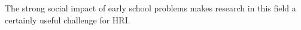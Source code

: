 \documentclass{sig-alternate}
\begin{document}
The strong social impact of early school problems makes research in this field
a certainly useful challenge for HRI.








\end{document}
